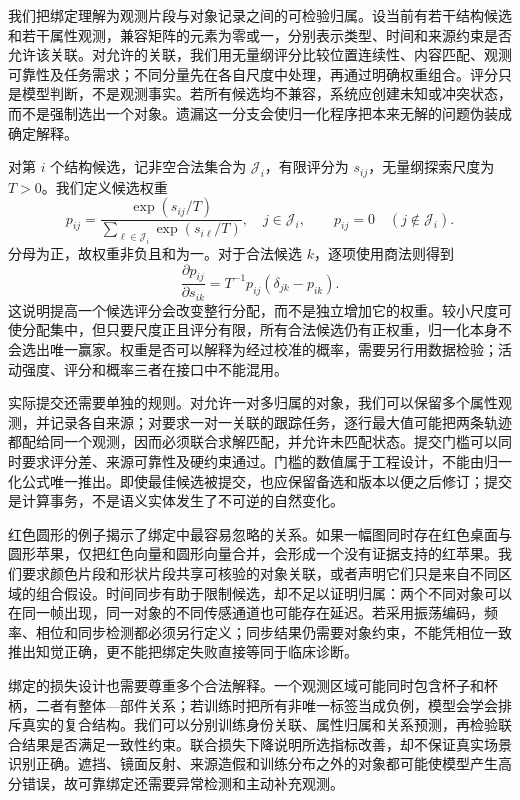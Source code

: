 我们把绑定理解为观测片段与对象记录之间的可检验归属。设当前有若干结构候选和若干属性观测，兼容矩阵的元素为零或一，分别表示类型、时间和来源约束是否允许该关联。对允许的关联，我们用无量纲评分比较位置连续性、内容匹配、观测可靠性及任务需求；不同分量先在各自尺度中处理，再通过明确权重组合。评分只是模型判断，不是观测事实。若所有候选均不兼容，系统应创建未知或冲突状态，而不是强制选出一个对象。遗漏这一分支会使归一化程序把本来无解的问题伪装成确定解释。

对第 $i$ 个结构候选，记非空合法集合为 $\mathcal J_i$，有限评分为 $s_{ij}$，无量纲探索尺度为 $T>0$。我们定义候选权重
\[
 p_{ij}=\frac{\exp(s_{ij}/T)}{\sum_{\ell\in\mathcal J_i}\exp(s_{i\ell}/T)},\quad j\in\mathcal J_i,
 \qquad p_{ij}=0\quad(j\notin\mathcal J_i).
\]
分母为正，故权重非负且和为一。对于合法候选 $k$，逐项使用商法则得到
\[
 \frac{\partial p_{ij}}{\partial s_{ik}}
 =T^{-1}p_{ij}(\delta_{jk}-p_{ik}).
\]
这说明提高一个候选评分会改变整行分配，而不是独立增加它的权重。较小尺度可使分配集中，但只要尺度正且评分有限，所有合法候选仍有正权重，归一化本身不会选出唯一赢家。权重是否可以解释为经过校准的概率，需要另行用数据检验；活动强度、评分和概率三者在接口中不能混用。

实际提交还需要单独的规则。对允许一对多归属的对象，我们可以保留多个属性观测，并记录各自来源；对要求一对一关联的跟踪任务，逐行最大值可能把两条轨迹都配给同一个观测，因而必须联合求解匹配，并允许未匹配状态。提交门槛可以同时要求评分差、来源可靠性及硬约束通过。门槛的数值属于工程设计，不能由归一化公式唯一推出。即使最佳候选被提交，也应保留备选和版本以便之后修订；提交是计算事务，不是语义实体发生了不可逆的自然变化。

红色圆形的例子揭示了绑定中最容易忽略的关系。如果一幅图同时存在红色桌面与圆形苹果，仅把红色向量和圆形向量合并，会形成一个没有证据支持的红苹果。我们要求颜色片段和形状片段共享可核验的对象关联，或者声明它们只是来自不同区域的组合假设。时间同步有助于限制候选，却不足以证明归属：两个不同对象可以在同一帧出现，同一对象的不同传感通道也可能存在延迟。若采用振荡编码，频率、相位和同步检测都必须另行定义；同步结果仍需要对象约束，不能凭相位一致推出知觉正确，更不能把绑定失败直接等同于临床诊断。

绑定的损失设计也需要尊重多个合法解释。一个观测区域可能同时包含杯子和杯柄，二者有整体—部件关系；若训练时把所有非唯一标签当成负例，模型会学会排斥真实的复合结构。我们可以分别训练身份关联、属性归属和关系预测，再检验联合结果是否满足一致性约束。联合损失下降说明所选指标改善，却不保证真实场景识别正确。遮挡、镜面反射、来源造假和训练分布之外的对象都可能使模型产生高分错误，故可靠绑定还需要异常检测和主动补充观测。

